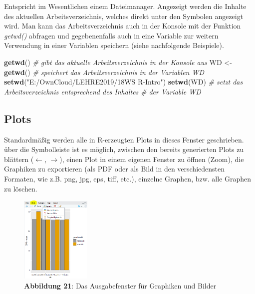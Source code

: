 \documentclass[]{article}
\newenvironment{Shaded}{\begin{snugshade}}{\end{snugshade}}
\newcommand{\KeywordTok}[1]{\textcolor[rgb]{0.13,0.29,0.53}{\textbf{#1}}}
\newcommand{\StringTok}[1]{\textcolor[rgb]{0.31,0.60,0.02}{#1}}
\newcommand{\CommentTok}[1]{\textcolor[rgb]{0.56,0.35,0.01}{\textit{#1}}}
\newcommand{\NormalTok}[1]{#1}
\begin{document}
Entspricht im Wesentlichen einem Dateimanager. Angezeigt werden die
Inhalte des aktuellen Arbeitsverzeichnis, welches direkt unter den
Symbolen angezeigt wird. Man kann das Arbeitsverzeichnis auch in der
Konsole mit der Funktion \emph{getwd()} abfragen und gegebenenfalls auch
in eine Variable zur weitern Verwendung in einer Variablen speichern
(siehe nachfolgende Beispiele).

\begin{Shaded}
\begin{Highlighting}[]
\KeywordTok{getwd}\NormalTok{()       }\CommentTok{# gibt das aktuelle Arbeitsverzeichnis in der Konsole aus}
\NormalTok{WD <-}\StringTok{ }\KeywordTok{getwd}\NormalTok{() }\CommentTok{# speichert das Arbeitsverzeichnis in der Variablen WD}
\KeywordTok{setwd}\NormalTok{(}\StringTok{"E:/OwnCloud/LEHRE2019/18WS R-Intro"}\NormalTok{)}
\KeywordTok{setwd}\NormalTok{(WD)     }\CommentTok{# setzt das Arbeitsverzeichnis entsprechend des Inhaltes }
              \CommentTok{# der Variable WD}
\end{Highlighting}
\end{Shaded}

\subsection*{Plots}\label{plots}

Standardmäßig werden alle in R-erzeugten Plots in dieses Fenster
geschrieben. über die Symbolleiste ist es möglich, zwischen den bereits
generierten Plots zu blättern (\(\leftarrow\), \(\rightarrow\)), einen
Plot in einem eigenen Fenster zu öffnen (Zoom), die Graphiken zu
exportieren (als PDF oder als Bild in den verschiedensten Formaten, wie
z.B. png, jpg, eps, tiff, etc.), einzelne Graphen, bzw. alle Graphen zu
löschen.

\begin{figure}
\centering
\includegraphics[width=0.30000\textwidth]{Images/05_Plots.PNG}
\caption{\textbf{Abbildung 21}: Das Ausgabefenster für Graphiken und
Bilder}
\end{figure}
\end{document}
